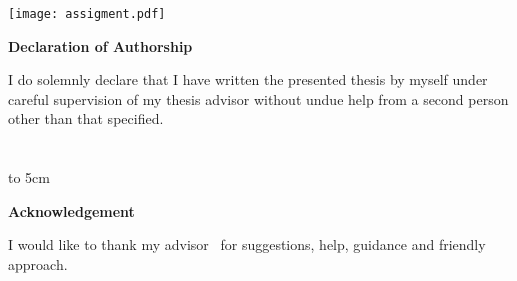 {\vfill\noindent\mfplacedate\hfill\mfauthor}
\newpage

\pagestyle{plain}
\texttt{[image: assigment.pdf]}

\newpage

\pagestyle{plain}

\vspace*{8cm}
\begin{centering}
  {\textbf{Declaration of Authorship}}
\end{centering}
\bigskip\bigskip

\begin{centering}
  \begin{minipage}{0.72\textwidth}
  I do solemnly declare that I have written the presented thesis by myself
  under careful supervision of my thesis advisor without undue help from
  a second person other than that specified.
  \\ \\ \\
  \hfill\hbox to 5cm{\dotfill}
  \end{minipage}
\end{centering}

\newpage

\vspace*{7cm}
\begin{centering}
  {\textbf{Acknowledgement}}
\end{centering}
\bigskip\bigskip

I would like to thank my advisor \mfadvisor\ for suggestions, help, guidance and
friendly approach.
\vspace{1cm}
